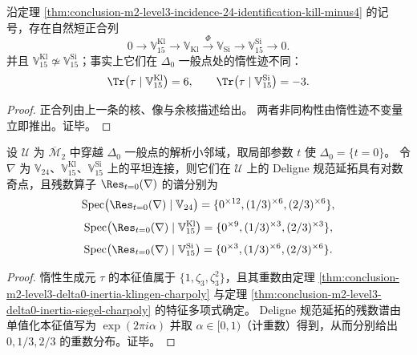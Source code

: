 \begin{corollary}\label{cor:conclusion-m2-level3-incidence-exact-sequence-15-separation}
沿定理 \ref{thm:conclusion-m2-level3-incidence-24-identification-kill-minus4} 的记号，存在自然短正合列
\[
0\longrightarrow \mathbb V_{15}^{\mathrm{Kl}}
\longrightarrow \mathbb V_{\mathrm{Kl}}
\xrightarrow{\ \Phi\ }
\mathbb V_{\mathrm{Si}}
\longrightarrow \mathbb V_{15}^{\mathrm{Si}}
\longrightarrow 0.
\]
并且 \(\mathbb V_{15}^{\mathrm{Kl}}\not\simeq \mathbb V_{15}^{\mathrm{Si}}\)；事实上它们在 \(\Delta_0\) 一般点处的惰性迹不同：
\[
\Tr\bigl(\tau\mid \mathbb V_{15}^{\mathrm{Kl}}\bigr)=6,\qquad
\Tr\bigl(\tau\mid \mathbb V_{15}^{\mathrm{Si}}\bigr)=-3.
\]
\end{corollary}
\begin{proof}
正合列由上一条的核、像与余核描述给出。
两者非同构性由惰性迹不变量立即推出。证毕。
\end{proof}

\begin{proposition}\label{prop:conclusion-m2-level3-delta0-deligne-residue-spectrum}
设 \(\mathcal U\) 为 \(\overline{\mathcal M}_2\) 中穿越 \(\Delta_0\) 一般点的解析小邻域，取局部参数 \(t\) 使 \(\Delta_0=\{t=0\}\)。
令 \(\nabla\) 为 \(\mathbb V_{24}\)、\(\mathbb V_{15}^{\mathrm{Kl}}\)、\(\mathbb V_{15}^{\mathrm{Si}}\) 上的平坦连接，则它们在 \(\mathcal U\) 上的 Deligne 规范延拓具有对数奇点，且残数算子 \(\Res_{t=0}(\nabla)\) 的谱分别为
\[
\mathrm{Spec}\bigl(\Res_{t=0}(\nabla)\mid \mathbb V_{24}\bigr)=\{0^{\times 12},(1/3)^{\times 6},(2/3)^{\times 6}\},
\]
\[
\mathrm{Spec}\bigl(\Res_{t=0}(\nabla)\mid \mathbb V_{15}^{\mathrm{Kl}}\bigr)=\{0^{\times 9},(1/3)^{\times 3},(2/3)^{\times 3}\},
\]
\[
\mathrm{Spec}\bigl(\Res_{t=0}(\nabla)\mid \mathbb V_{15}^{\mathrm{Si}}\bigr)=\{0^{\times 3},(1/3)^{\times 6},(2/3)^{\times 6}\}.
\]
\end{proposition}
\begin{proof}
惰性生成元 \(\tau\) 的本征值属于 \(\{1,\zeta_3,\zeta_3^2\}\)，且其重数由定理 \ref{thm:conclusion-m2-level3-delta0-inertia-klingen-charpoly} 与定理 \ref{thm:conclusion-m2-level3-delta0-inertia-siegel-charpoly} 的特征多项式确定。
Deligne 规范延拓的残数谱由单值化本征值写为 \(\exp(2\pi i\alpha)\) 并取 \(\alpha\in[0,1)\)（计重数）得到，从而分别给出 \(0,1/3,2/3\) 的重数分布。证毕。
\end{proof}

